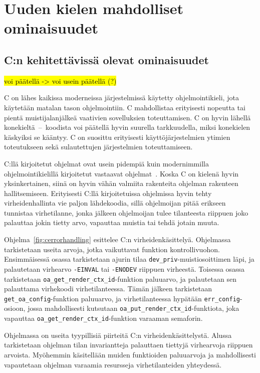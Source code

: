\section{Uuden kielen mahdolliset ominaisuudet}

\subsection{C:n kehitettävissä olevat ominaisuudet}

\hl{voi päätellä -> voi usein päätellä (?)}

C on lähes kaikissa moderneissa järjestelmissä käytetty ohjelmointikieli, jota
käytetään matalan tason ohjelmointiin. C mahdollistaa erityisesti nopeutta tai
pientä muistijalanjälkeä vaativien sovelluksien toteuttamisen. C on hyvin
lähellä konekieltä~--~koodista voi päätellä hyvin suurella tarkkuudella, miksi
konekielen käskyiksi se kääntyy. C on suosittu erityisesti käyttöjärjestelmien
ytimien toteutukseen sekä sulautettujen järjestelmien toteuttamiseen.

C:llä kirjoitetut ohjelmat ovat usein pidempiä kuin modernimmilla
ohjelmointikielillä kirjoitetut vastaavat ohjelmat~\citep{codelength,
qsmcodelength}. Koska C on kielenä hyvin yksinkertainen, siinä on hyvin vähän
valmiita rakenteita ohjelman rakenteen hallitsemiseen. Erityisesti C:llä
kirjoitetuissa ohjelmissa hyvin tehty virheidenhallinta vie paljon lähdekoodia,
sillä ohjelmoijan pitää erikseen tunnistaa virhetilanne, jonka jälkeen
ohjelmoijan tulee tilanteesta riippuen joko palauttaa jokin tietty arvo,
vapauttaa muistia tai tehdä jotain muuta.

Ohjelma~\ref{fig:cerrorhandling} esittelee C:n virheidenkäsittelyä. Ohjelmassa
tarkistetaan useita arvoja, jotka vaikuttavat funktion kontrollivuohon.
Ensimmäisessä osassa tarkistetaan ajurin tilaa
\texttt{dev\_priv}-muistiosoittimen läpi, ja palautetaan virhearvo
\texttt{-EINVAL} tai \texttt{-ENODEV} riippuen virheestä. Toisessa osassa
tarkistetaan \texttt{oa\_get\_render\_ctx\_id}-funktion paluuarvo, ja
palautetaan sen palauttama virhekoodi virhetilanteessa. Tämän jälkeen
tarkistetaan \texttt{get\_oa\_config}-funktion paluuarvo, ja virhetilanteessa
hypätään \texttt{err\_config}-osioon, jossa mahdollisesti kutsutaan
\texttt{oa\_put\_render\_ctx\_id}-funktiota, joka vapauttaa
\texttt{oa\_get\_render\_ctx\_id}-funktion varaaman semaforin.

Ohjelmassa on useita tyypillisiä piirteitä C:n virheidenkäsittelystä. Alussa
tarkistetaan ohjelman tilan invariantteja palauttaen tiettyjä virhearvoja
riippuen arvoista. Myöhemmin käsitellään muiden funktioiden paluuarvoja ja
mahdollisesti vapautetaan ohjelman varaamia resursseja virhetilanteiden
yhteydessä.


